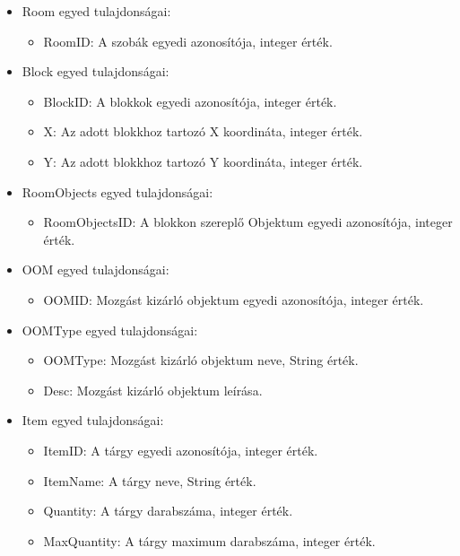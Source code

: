\begin{itemize}

    \item Room egyed tulajdonságai:
    
    \begin{itemize}
        \item RoomID: A szobák egyedi azonosítója, integer érték.
    \end{itemize}

    \item Block egyed tulajdonságai:
    
    \begin{itemize}
        \item BlockID: A blokkok egyedi azonosítója, integer érték.
        \item X: Az adott blokkhoz tartozó X koordináta, integer érték.
        \item Y: Az adott blokkhoz tartozó Y koordináta, integer érték.
    \end{itemize}

    \item RoomObjects egyed tulajdonságai:
    
    \begin{itemize}
        \item RoomObjectsID: A blokkon szereplő Objektum egyedi azonosítója, integer érték.
    \end{itemize}

    \item OOM egyed tulajdonságai:
    
    \begin{itemize}
        \item OOMID: Mozgást kizárló objektum egyedi azonosítója, integer érték.
    \end{itemize}

    \item OOMType egyed tulajdonságai:
    
    \begin{itemize}
        \item OOMType: Mozgást kizárló objektum neve, String érték.
        \item Desc: Mozgást kizárló objektum leírása.
    \end{itemize}

    \item Item egyed tulajdonságai:
    
    \begin{itemize}
        \item ItemID: A tárgy egyedi azonosítója, integer érték. 
        \item ItemName: A tárgy neve, String érték.
        \item Quantity: A tárgy darabszáma, integer érték.
        \item MaxQuantity: A tárgy maximum darabszáma, integer érték.
    \end{itemize}


\end{itemize}
